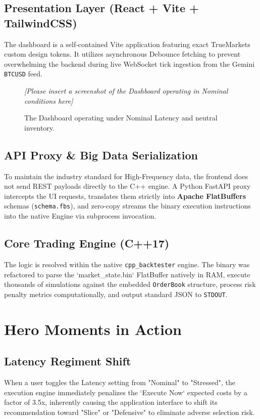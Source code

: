 \documentclass[11pt, a4paper]{article}
\begin{document}
\subsection{Presentation Layer (React + Vite + TailwindCSS)}
The dashboard is a self-contained Vite application featuring exact TrueMarkets custom design tokens. It utilizes asynchronous Debounce fetching to prevent overwhelming the backend during live WebSocket tick ingestion from the Gemini \texttt{BTCUSD} feed.

\begin{figure}[H]
    \centering
    \textit{[Please insert a screenshot of the Dashboard operating in Nominal conditions here]}
    \caption{The Dashboard operating under Nominal Latency and neutral inventory.}
\end{figure}

\subsection{API Proxy \& Big Data Serialization}
To maintain the industry standard for High-Frequency data, the frontend does not send REST payloads directly to the C++ engine. A Python FastAPI proxy intercepts the UI requests, translates them strictly into \textbf{Apache FlatBuffers} schemas (\texttt{schema.fbs}), and zero-copy streams the binary execution instructions into the native Engine via subprocess invocation.

\subsection{Core Trading Engine (C++17)}
The logic is resolved within the native \texttt{cpp\_backtester} engine. The binary was refactored to parse the `market\_state.bin` FlatBuffer natively in RAM, execute thousands of simulations against the embedded \texttt{OrderBook} structure, process risk penalty metrics computationally, and output standard JSON to \texttt{STDOUT}.

\section{Hero Moments in Action}

\subsection{Latency Regiment Shift}
When a user toggles the Latency setting from "Nominal" to "Stressed", the execution engine immediately penalizes the `Execute Now` expected costs by a factor of 3.5x, inherently causing the application interface to shift its recommendation toward "Slice" or "Defensive" to eliminate adverse selection risk.
\end{document}
